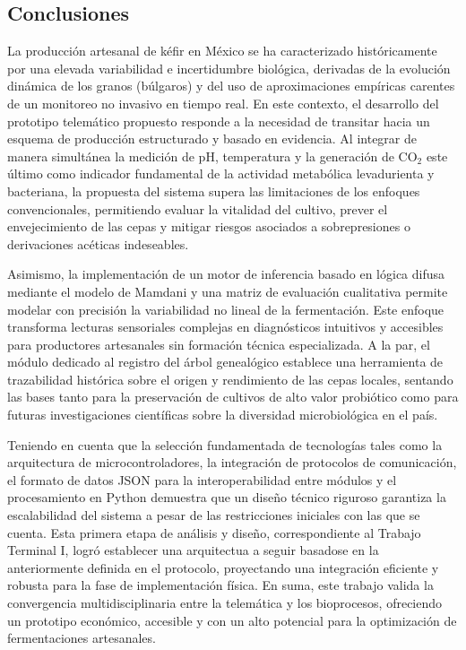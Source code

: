 \subsection{Conclusiones}


La producción artesanal de kéfir en México se ha caracterizado históricamente por 
una elevada variabilidad e incertidumbre biológica, derivadas de la evolución dinámica de 
los granos (búlgaros) y del uso de aproximaciones empíricas carentes de un monitoreo 
no invasivo en tiempo real. En este contexto, el desarrollo del prototipo telemático propuesto 
responde a la necesidad de transitar hacia un esquema de producción estructurado y basado en evidencia.
Al integrar de manera simultánea la medición de pH, temperatura y la generación de $\text{CO}_2$ 
este último como indicador fundamental de la actividad metabólica levadurienta y bacteriana,
la propuesta del sistema supera las limitaciones de los enfoques convencionales, 
permitiendo evaluar la vitalidad del cultivo, prever el envejecimiento de las cepas y 
mitigar riesgos asociados a sobrepresiones o derivaciones acéticas indeseables.

Asimismo, la implementación de un motor de inferencia basado en 
lógica difusa mediante el modelo de Mamdani y una matriz de evaluación cualitativa permite modelar 
con precisión la variabilidad no lineal de la fermentación. 
Este enfoque transforma lecturas sensoriales complejas en diagnósticos intuitivos y accesibles para 
productores artesanales sin formación técnica especializada. 
A la par, el módulo dedicado al registro del árbol genealógico establece una herramienta 
de trazabilidad histórica sobre el origen y rendimiento de las cepas locales, 
sentando las bases tanto para la preservación de cultivos de alto valor probiótico 
como para futuras investigaciones científicas sobre la diversidad microbiológica en el país.

Teniendo en cuenta que la selección fundamentada de 
tecnologías tales como la arquitectura de microcontroladores, la integración de protocolos de comunicación, 
el formato de datos JSON para la interoperabilidad entre módulos y el procesamiento en Python 
demuestra que un diseño técnico riguroso garantiza la escalabilidad del sistema a pesar 
de las restricciones iniciales con las que se cuenta. 
Esta primera etapa de análisis y diseño, correspondiente al Trabajo Terminal I, 
logró establecer una arquitectua a seguir basadose en la anteriormente definida en el protocolo,
proyectando una integración eficiente y robusta para la fase de implementación física. 
En suma, este trabajo valida la convergencia multidisciplinaria entre la telemática y los bioprocesos, 
ofreciendo un prototipo económico, accesible y con un alto potencial para la optimización de fermentaciones artesanales.